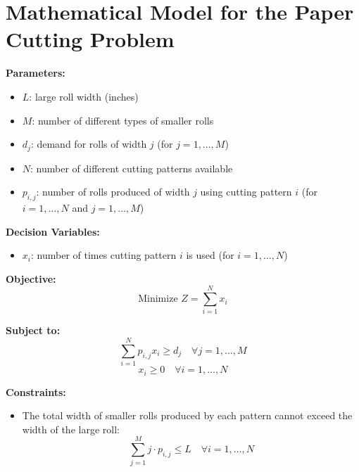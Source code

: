 \documentclass{article}
\begin{document}
\section*{Mathematical Model for the Paper Cutting Problem}

\textbf{Parameters:}
\begin{itemize}
    \item $L$: large roll width (inches)
    \item $M$: number of different types of smaller rolls
    \item $d_j$: demand for rolls of width $j$ (for $j = 1, \ldots, M$)
    \item $N$: number of different cutting patterns available
    \item $p_{i,j}$: number of rolls produced of width $j$ using cutting pattern $i$ (for $i = 1, \ldots, N$ and $j = 1, \ldots, M$)
\end{itemize}

\textbf{Decision Variables:}
\begin{itemize}
    \item $x_i$: number of times cutting pattern $i$ is used (for $i = 1, \ldots, N$)
\end{itemize}

\textbf{Objective:}
\[
\text{Minimize } Z = \sum_{i=1}^{N} x_i
\]

\textbf{Subject to:}
\[
\sum_{i=1}^{N} p_{i,j} x_i \geq d_j \quad \forall j = 1, \ldots, M
\]
\[
x_i \geq 0 \quad \forall i = 1, \ldots, N
\]

\textbf{Constraints:}
\begin{itemize}
    \item The total width of smaller rolls produced by each pattern cannot exceed the width of the large roll:
    \[
    \sum_{j=1}^{M} j \cdot p_{i,j} \leq L \quad \forall i = 1, \ldots, N
    \]
\end{itemize}
\end{document}
